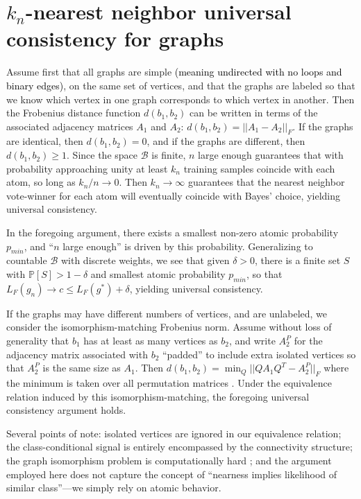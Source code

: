 \documentclass{article}
\newcommand{\mB}{\mathcal{B}}
\newcommand{\PP}{\mathbb{P}}           %
\providecommand{\tr}[1]{\textcolor{black}{#1}}
\begin{document}



\section{$k_n$-nearest neighbor universal consistency for graphs}
\label{proof}

Assume first that all graphs are simple \tr{(meaning undirected with no loops and binary edges)}, on the same set of vertices, and that the graphs are labeled so that we know which vertex in one graph corresponds to which vertex in another. Then the Frobenius distance function $d(b_1,b_2)$ can be written in terms of the associated adjacency matrices $A_1$ and $A_2$: $d(b_1,b_2) = ||A_1-A_2||_F$. If the graphs are identical, then $d(b_1,b_2) = 0$, and if the graphs are different, then $d(b_1,b_2) \geq 1$. Since the space $\mB$ is finite, $n$ large enough guarantees that with probability approaching unity at least $k_n$ training samples coincide with each atom, so long as $k_n/n \rightarrow 0$. Then $k_n \rightarrow \infty$ guarantees that the nearest neighbor vote-winner for each atom will eventually coincide with Bayes' choice, yielding universal consistency.

In the foregoing argument, there exists a smallest non-zero atomic probability $p_{min}$, and ``$n$ large enough'' is driven by this probability. Generalizing to countable $\mB$ with discrete weights, we see that given $\delta > 0$, there is a finite set $S$ with $\PP[S]>1-\delta$ and smallest atomic probability $p_{min}$, so that $L_{F}(g_n) \rightarrow c \leq L_{F}(g^*) + \delta$, yielding universal consistency.

If the graphs may have different numbers of vertices, and are unlabeled, we consider the isomorphism-matching Frobenius norm. Assume without loss of generality that $b_1$ has at least as many vertices as $b_2$, and write $A_2^P$ for the adjacency matrix associated with $b_2$ ``padded'' to include extra isolated vertices so that $A_2^P$ is the same size as $A_1$. Then $d(b_1,b_2) = \min_Q ||Q A_1 Q^T - A_2^P||_F$ where the minimum is taken over all permutation matrices \cite{HornJohnson90}. Under the equivalence relation induced by this isomorphism-matching, the foregoing universal consistency argument holds.

Several points of note:  isolated vertices are ignored in our equivalence relation; the class-conditional signal is entirely encompassed by the connectivity structure; the graph isomorphism problem is computationally hard \cite{ConroyLouis97,ZaslavskiyVert08}; and the argument employed here does not capture the concept of ``nearness implies likelihood of similar class''---we simply rely on atomic behavior.
\end{document}
